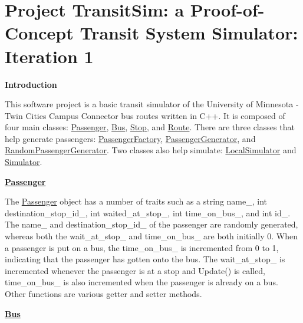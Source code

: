 \hypertarget{index_intro_sec}{}\section{Project Transit\+Sim\+: a Proof-\/of-\/\+Concept Transit System Simulator\+: Iteration 1}\label{index_intro_sec}
{\bfseries Introduction}

This software project is a basic transit simulator of the University of Minnesota -\/ Twin Cities Campus Connector bus routes written in C++. It is composed of four main classes\+: \hyperlink{classPassenger}{Passenger}, \hyperlink{classBus}{Bus}, \hyperlink{classStop}{Stop}, and \hyperlink{classRoute}{Route}. There are three classes that help generate passengers\+: \hyperlink{classPassengerFactory}{Passenger\+Factory}, \hyperlink{classPassengerGenerator}{Passenger\+Generator}, and \hyperlink{classRandomPassengerGenerator}{Random\+Passenger\+Generator}. Two classes also help simulate\+: \hyperlink{classLocalSimulator}{Local\+Simulator} and \hyperlink{classSimulator}{Simulator}.

{\bfseries \hyperlink{classPassenger}{Passenger}}

The \hyperlink{classPassenger}{Passenger} object has a number of traits such as a string name\+\_\+, int destination\+\_\+stop\+\_\+id\+\_\+, int waited\+\_\+at\+\_\+stop\+\_\+, int time\+\_\+on\+\_\+bus\+\_\+, and int id\+\_\+. The name\+\_\+ and destination\+\_\+stop\+\_\+id\+\_\+ of the passenger are randomly generated, whereas both the wait\+\_\+at\+\_\+stop\+\_\+ and time\+\_\+on\+\_\+bus\+\_\+ are both initially 0. When a passenger is put on a bus, the time\+\_\+on\+\_\+bus\+\_\+ is incremented from 0 to 1, indicating that the passenger has gotten onto the bus. The wait\+\_\+at\+\_\+stop\+\_\+ is incremented whenever the passenger is at a stop and Update() is called, time\+\_\+on\+\_\+bus\+\_\+ is also incremented when the passenger is already on a bus. Other functions are various getter and setter methods.

{\bfseries \hyperlink{classBus}{Bus}}

